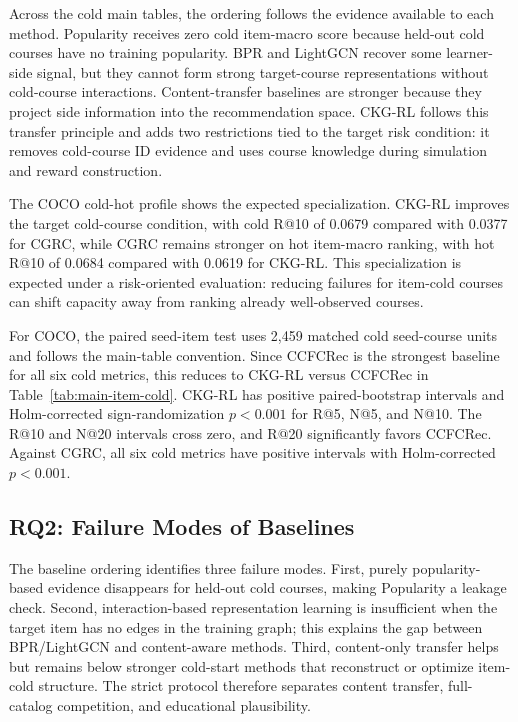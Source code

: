 \documentclass[sigconf,anonymous,review]{acmart}
\begin{document}
Across the cold main tables, the ordering follows the evidence available to each method. Popularity receives zero cold item-macro score because held-out cold courses have no training popularity. BPR and LightGCN recover some learner-side signal, but they cannot form strong target-course representations without cold-course interactions. Content-transfer baselines are stronger because they project side information into the recommendation space. CKG-RL follows this transfer principle and adds two restrictions tied to the target risk condition: it removes cold-course ID evidence and uses course knowledge during simulation and reward construction.

The COCO cold-hot profile shows the expected specialization. CKG-RL improves the target cold-course condition, with cold R@10 of 0.0679 compared with 0.0377 for CGRC, while CGRC remains stronger on hot item-macro ranking, with hot R@10 of 0.0684 compared with 0.0619 for CKG-RL. This specialization is expected under a risk-oriented evaluation: reducing failures for item-cold courses can shift capacity away from ranking already well-observed courses.

For COCO, the paired seed-item test uses 2,459 matched cold seed-course units and follows the main-table convention. Since CCFCRec is the strongest baseline for all six cold metrics, this reduces to CKG-RL versus CCFCRec in Table~\ref{tab:main-item-cold}. CKG-RL has positive paired-bootstrap intervals and Holm-corrected sign-randomization \(p<0.001\) for R@5, N@5, and N@10. The R@10 and N@20 intervals cross zero, and R@20 significantly favors CCFCRec. Against CGRC, all six cold metrics have positive intervals with Holm-corrected \(p<0.001\).

\subsection{RQ2: Failure Modes of Baselines}
The baseline ordering identifies three failure modes. First, purely popularity-based evidence disappears for held-out cold courses, making Popularity a leakage check. Second, interaction-based representation learning is insufficient when the target item has no edges in the training graph; this explains the gap between BPR/LightGCN and content-aware methods. Third, content-only transfer helps but remains below stronger cold-start methods that reconstruct or optimize item-cold structure. The strict protocol therefore separates content transfer, full-catalog competition, and educational plausibility.
\end{document}

